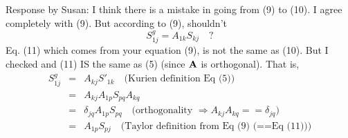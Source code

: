\documentclass[12pt]{article}
\begin{document}
Response by Susan:
   I think there is a mistake in going from (9) to (10). I agree completely with (9). But according to (9), shouldn't 
\begin{equation}S^g_{1j} = A_{1k} S_{kj}\quad ?\end{equation}
Eq. (11) which comes from your equation (9), is not the same as
(10). But I checked and (11) IS the same as (5) (since ${\bf A}$ is
orthogonal). That is,
\begin{eqnarray}S^g_{1j} &=& A_{kj} S'_{1k} \quad \mbox{(Kurien definition Eq (5))} \\
&=& A_{kj} A_{1p} S_{pq} A_{kq} \\
&=& \delta_{jq} A_{1p} S_{pq} \quad \mbox{(orthogonality $\Rightarrow A_{kj}A_{kq} == \delta_{jq}$)} \\ 
&=& A_{1p} S_{pj} \quad \mbox{(Taylor definition from Eq (9) (==Eq (11)))} 
\end{eqnarray}
\end{document}
